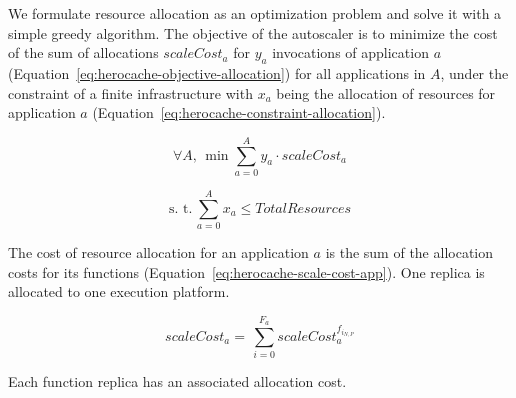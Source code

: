 

We formulate resource allocation as an optimization problem and solve it with a simple greedy algorithm. The objective of the autoscaler is to minimize the cost of the sum of allocations $scaleCost_{a}$ for $y_a$ invocations of application $a$ (Equation~\ref{eq:herocache-objective-allocation}) for all applications in $A$, under the constraint of a finite infrastructure with $x_a$ being the allocation of resources for application $a$ (Equation~\ref{eq:herocache-constraint-allocation}). 

\begin{equation}
    \forall A, \, \min \sum_{a = 0}^{A} y_a \cdot scaleCost_{a}
\label{eq:herocache-objective-allocation}
\end{equation}

\begin{equation}
    \text{s. t.} \, \sum_{a = 0}^{A} x_a \leq Total Resources
\label{eq:herocache-constraint-allocation}
\end{equation}

The cost of resource allocation for an application $a$ is the sum of the allocation costs for its functions (Equation~\ref{eq:herocache-scale-cost-app}). One replica is allocated to one execution platform.

\begin{equation}
    scaleCost_{a} = \, \sum_{i = 0}^{F_{a}} scaleCost^{{f}_{{i}_{N, P}}}_a
\label{eq:herocache-scale-cost-app}
\end{equation}

Each function replica has an associated allocation cost. %

